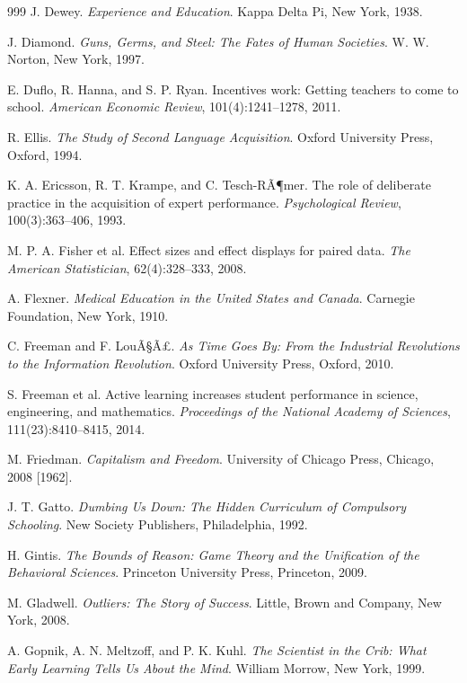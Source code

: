\documentclass[11pt]{article}
\begin{document}
\begin{thebibliography}{999}
J. Dewey.
\textit{Experience and Education}.
Kappa Delta Pi, New York, 1938.

J. Diamond.
\textit{Guns, Germs, and Steel: The Fates of Human Societies}.
W. W. Norton, New York, 1997.

E. Duflo, R. Hanna, and S. P. Ryan.
Incentives work: Getting teachers to come to school.
\textit{American Economic Review}, 101(4):1241--1278, 2011.

R. Ellis.
\textit{The Study of Second Language Acquisition}.
Oxford University Press, Oxford, 1994.

K. A. Ericsson, R. T. Krampe, and C. Tesch-RÃ¶mer.
The role of deliberate practice in the acquisition of expert performance.
\textit{Psychological Review}, 100(3):363--406, 1993.

M. P. A. Fisher et al.
Effect sizes and effect displays for paired data.
\textit{The American Statistician}, 62(4):328--333, 2008.

A. Flexner.
\textit{Medical Education in the United States and Canada}.
Carnegie Foundation, New York, 1910.

C. Freeman and F. LouÃ§Ã£.
\textit{As Time Goes By: From the Industrial Revolutions to the Information Revolution}.
Oxford University Press, Oxford, 2010.

S. Freeman et al.
Active learning increases student performance in science, engineering, and mathematics.
\textit{Proceedings of the National Academy of Sciences}, 111(23):8410--8415, 2014.

M. Friedman.
\textit{Capitalism and Freedom}.
University of Chicago Press, Chicago, 2008 [1962].

J. T. Gatto.
\textit{Dumbing Us Down: The Hidden Curriculum of Compulsory Schooling}.
New Society Publishers, Philadelphia, 1992.

H. Gintis.
\textit{The Bounds of Reason: Game Theory and the Unification of the Behavioral Sciences}.
Princeton University Press, Princeton, 2009.

M. Gladwell.
\textit{Outliers: The Story of Success}.
Little, Brown and Company, New York, 2008.

A. Gopnik, A. N. Meltzoff, and P. K. Kuhl.
\textit{The Scientist in the Crib: What Early Learning Tells Us About the Mind}.
William Morrow, New York, 1999.


\end{thebibliography}
\end{document}
